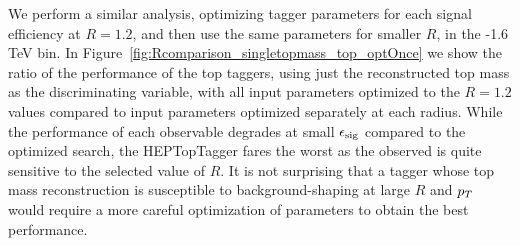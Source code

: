 We perform a similar analysis, optimizing tagger parameters for each signal efficiency at $R=1.2$, and then use the same parameters for smaller $R$, in the -1.6 TeV bin. In Figure~\ref{fig:Rcomparison_singletopmass_top_optOnce} we show the ratio of the performance of the top taggers, using just the reconstructed top mass as the discriminating variable, with all input parameters optimized to the $R=1.2$ values compared to input parameters optimized separately at each radius. While the performance of each observable degrades at small $\epsilon_{\rm sig}$ compared to the optimized search, the HEPTopTagger fares the worst as the observed is quite sensitive to the selected value of $R$. It is not surprising that a tagger whose top mass reconstruction is susceptible to background-shaping at large $R$ and $p_T$ would require a more careful optimization of parameters to obtain the best performance.

